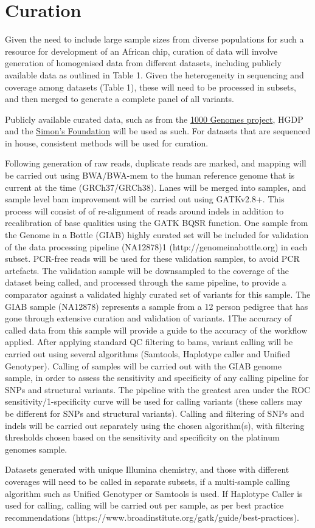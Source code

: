 \section{Curation}
Given the need to include large sample sizes from diverse populations for such a resource for development of an African chip, curation of data will involve generation of homogenised data from different datasets, including publicly available data as outlined in Table 1. Given the heterogeneity in sequencing and coverage among datasets (Table 1), these will need to be processed in subsets, and then merged to generate a complete panel of all variants. 

Publicly available curated data, such as from the \href{http://www.1000genomes.org}{1000 Genomes project}, HGDP and the \href{http://www.simonsfoundation.org/}{Simon’s Foundation} will be used as such. For datasets that are sequenced in house, consistent methods will be used for curation.

Following generation of raw reads, duplicate reads are marked, and mapping will be carried out using BWA/BWA-mem to the human reference genome that is current at the time (GRCh37/GRCh38). Lanes will be merged into samples, and sample level bam improvement will be carried out using GATKv2.8+. This process will consist of of re-alignment of reads around indels in addition to recalibration of base qualities using the GATK BQSR function. One sample from the Genome in a Bottle (GIAB) highly curated set will be included for validation of the data processing pipeline (NA12878)1 (http://genomeinabottle.org) in each subset. PCR-free reads will be used for these validation samples, to avoid PCR artefacts. The validation sample will be downsampled to the coverage of the dataset being called, and processed through the same pipeline, to provide a comparator against a validated highly curated set of variants for this sample. The GIAB sample (NA12878) represents a sample from a 12 person pedigree that has gone through extensive curation and validation of variants. 1The accuracy of called data from this sample will provide a guide to the accuracy of the workflow applied. After applying standard QC filtering to bams, variant calling will be carried out using several algorithms (Samtools, Haplotype caller and Unified Genotyper). Calling of samples will be carried out with the GIAB genome sample, in order to assess the sensitivity and specificity of any calling pipeline for SNPs and structural variants. The pipeline with the greatest area under the ROC sensitivity/1-specificity curve will be used for calling variants (these callers may be different for SNPs and structural variants). Calling and filtering of SNPs and indels will be carried out separately using the chosen algorithm(s), with filtering thresholds chosen based on the sensitivity and specificity on the platinum genomes sample. 

Datasets generated with unique Illumina chemistry, and those with different coverages will need to be called in separate subsets, if a multi-sample calling algorithm such as Unified Genotyper or Samtools is used. If Haplotype Caller is used for calling, calling will be carried out per sample, as per best practice recommendations (https://www.broadinstitute.org/gatk/guide/best-practices).